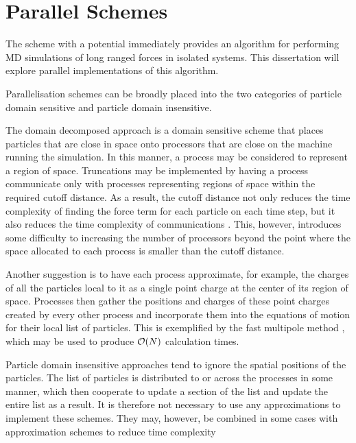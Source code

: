 \section{Parallel Schemes}

%
The \velocityverlet{} scheme with a \twobody{} potential
immediately provides an algorithm for
performing MD simulations of long ranged forces in isolated systems.
%
This dissertation will explore parallel implementations of this algorithm.

%
Parallelisation schemes can be broadly placed into the two categories
of particle domain sensitive and particle domain insensitive.

The domain decomposed approach is a domain sensitive scheme
that places particles that are
close in space onto processors that are close on the machine running
the simulation.
%
In this manner, a process may be considered to represent a region of space.
%
Truncations may be implemented by having a process communicate
only with processes representing regions of space within the required
cutoff distance.
%
As a result, the cutoff distance not only reduces the time complexity
of finding the force term for each particle on each time step,
but it also reduces the time complexity of communications
\cite{plimpton1995fast}.
%
This, however, introduces some difficulty to increasing the number
of processors beyond the point where the space allocated to
each process is smaller than the cutoff distance.

Another suggestion is to have each process approximate, for example,
the charges of all the particles local to it as a single point charge
at the center of its region of space.
%
Processes then gather the positions and charges of these point charges
created by every other process and incorporate them into the equations
of motion for their local list of particles.
%
This is exemplified by the fast multipole method
\cite{appel1985efficient},
which may be used to produce $\mathcal{O}{\left({ N }\right)}$
\cite{esselink1992order} calculation times.


Particle domain insensitive approaches tend to ignore the spatial positions
of the particles.
%
The list of particles is distributed to or across  the processes in some manner,
which then cooperate to update a section of the list and update
the entire list as a result.
%
It is therefore not necessary to use any approximations to
implement these schemes.
%
They may, however, be combined in some cases with
approximation schemes to reduce time complexity
\cite{smith1994parallel}

